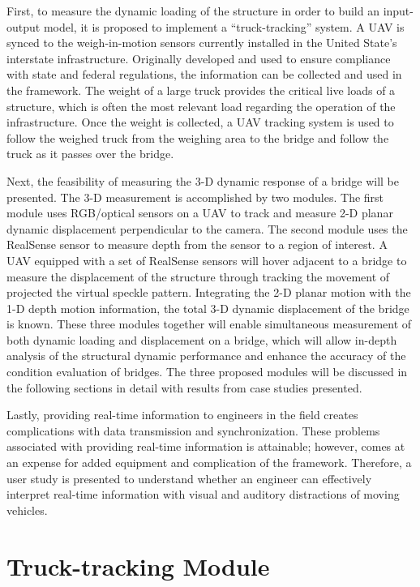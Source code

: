 \documentclass{sigchi}
\begin{document}
First, to measure the dynamic loading of the structure in order to build an input-output model, it is proposed to implement a ``truck-tracking'' system. A UAV is synced to the weigh-in-motion sensors currently installed in the United State's interstate infrastructure. Originally developed and used to ensure compliance with state and federal regulations, the information can be collected and used in the framework. The weight of a large truck provides the critical live loads of a structure, which is often the most relevant load regarding the operation of the infrastructure. Once the weight is collected, a UAV tracking system is used to follow the weighed truck from the weighing area to the bridge and follow the truck as it passes over the bridge.

Next, the feasibility of measuring the 3-D dynamic response of a bridge will be presented. The 3-D measurement is accomplished by two modules. The first module uses RGB/optical sensors on a UAV to track and measure 2-D planar dynamic displacement perpendicular to the camera. The second module uses the RealSense sensor to measure depth from the sensor to a region of interest. A UAV equipped with a set of RealSense sensors will hover adjacent to a bridge to measure the displacement of the structure through tracking the movement of projected the virtual speckle pattern. Integrating the 2-D planar motion with the 1-D depth motion information, the total 3-D dynamic displacement of the bridge is known. These three modules together will enable simultaneous measurement of both dynamic loading and displacement on a bridge, which will allow in-depth analysis of the structural dynamic performance and enhance the accuracy of the condition evaluation of bridges. The three proposed modules will be discussed in the following sections in detail with results from case studies presented.

Lastly, providing real-time information to engineers in the field creates complications with data transmission and synchronization. These problems associated with providing real-time information is attainable; however, comes at an expense for added equipment and complication of the framework. Therefore, a user study is presented to understand whether an engineer can effectively interpret real-time information with visual and auditory distractions of moving vehicles.

\section{Truck-tracking Module}
\end{document}
